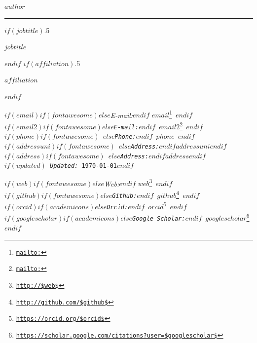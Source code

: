 \documentclass[$if(fontsize)$$fontsize$,$endif$$if(lang)$$babel-lang$,$endif$$if(papersize)$$papersize$paper,$endif$$for(classoption)$$classoption$$sep$,$endfor$]{$documentclass$}
\renewcommand{\href}[2]{#2\footnote{\url{#1}}}
\begin{document}
\begin{center}
  {\huge\bfseries $author$\par}
\end{center}

\vspace{2 mm}

\hrule

\vspace{2 mm}

$if(jobtitle)$\moveleft.5\hoffset\centerline{$jobtitle$}$endif$
$if(affiliation)$\moveleft.5\hoffset\centerline{$affiliation$}$endif$
\begin{minipage}[t]{0.6\textwidth}
$if(email)$$if(fontawesome)$\faEnvelope \hspace{1 mm}$else$\emph{E-mail:}$endif$ \href{mailto:}{\tt $email$} \hspace{1 mm}$endif$\\
$if(email2)$$if(fontawesome)$\faEnvelope \hspace{1 mm}$else$\emph{E-mail:}$endif$ \href{mailto:}{\tt $email2$} \hspace{1 mm}$endif$\\
$if(phone)$$if(fontawesome)$ \faPhone \hspace{1 mm}$else$\emph{Phone:}$endif$  $phone$  \hspace{1 mm} $endif$\\
$if(addressuni)$$if(fontawesome)${\large \faUniversity} \hspace{1 mm}$else$\emph{Address:}$endif${$addressuni$}$endif$\\
$if(address)$$if(fontawesome)${\large \faHome} \hspace{1 mm}$else$\emph{Address:}$endif${$address$}$endif$\\
$if(updated)$ \emph{Updated:} \today$endif$
\end{minipage}
\begin{minipage}[t]{0.4\textwidth}
$if(web)$$if(fontawesome)$\faGlobe \hspace{1 mm}$else$\emph{Web:}$endif$ \href{http://$web$}{\tt $web$}  $endif$\\
$if(github)$$if(fontawesome)$\faGithub \hspace{1 mm}$else$\emph{Github:}$endif$ \href{http://github.com/$github$}{\tt $github$} \hspace{1 mm} $endif$\\
$if(orcid)$$if(academicons)$\aiOrcidSquare \hspace{1 mm}$else$\emph{Orcid:}$endif$ \href{https://orcid.org/$orcid$}{\tt $orcid$} \hspace{1 mm} $endif$\\
$if(googlescholar)$$if(academicons)$\aiGoogleScholar \hspace{1 mm}$else$\emph{Google Scholar:}$endif$ \href{https://scholar.google.com/citations?user=$googlescholar$}{\tt $googlescholar$} \hspace{1 mm} $endif$
\end{minipage}
\end{document}
